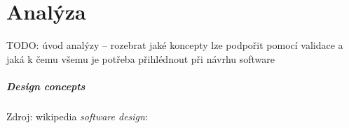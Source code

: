 \chapter{Analýza}



TODO: úvod analýzy -- rozebrat jaké koncepty lze podpořit pomocí validace a jaká k čemu všemu je potřeba přihlédnout při návrhu software

\paragraph{Design concepts} Zdroj: wikipedia \emph{software design}:
